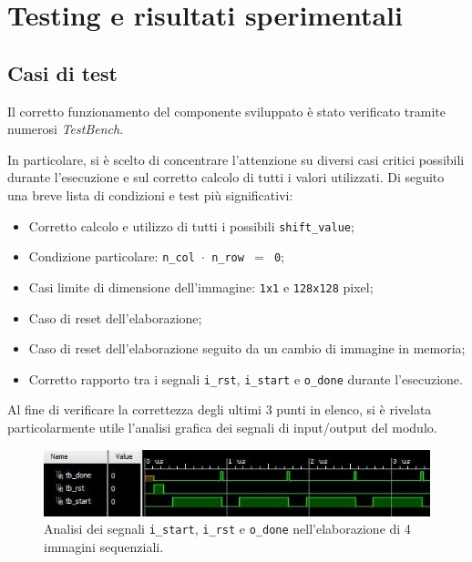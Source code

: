 \documentclass{article}
\begin{document}
\section{Testing e risultati sperimentali} %
\subsection{Casi di test} %
Il corretto funzionamento del componente sviluppato è stato verificato tramite numerosi \emph{TestBench}.\par In particolare, si è scelto di concentrare l’attenzione su diversi casi critici possibili durante l’esecuzione e sul corretto calcolo di tutti i valori utilizzati. Di seguito una breve lista di condizioni e test più significativi:

\begin{itemize}
    \item   Corretto calcolo e utilizzo di tutti i possibili \texttt{shift\_value};
    \item   Condizione particolare: \texttt{n\_col $\cdot$ n\_row $=$ 0}\footnotemark ;
    \item   Casi limite di dimensione dell’immagine: \texttt{1x1} e \texttt{128x128} pixel;
    \item   Caso di reset dell’elaborazione;
    \item   Caso di reset dell’elaborazione seguito da un cambio di immagine in memoria;
    \item   Corretto rapporto tra i segnali \texttt{i\_rst}, \texttt{i\_start} e \texttt{o\_done} durante   l’esecuzione.
\end{itemize}

Al fine di verificare la correttezza degli ultimi 3 punti in elenco, si è rivelata particolarmente utile l'analisi grafica dei segnali di input/output del modulo.
\vspace{0,2cm}

\begin{figure}[ht]
    \centering
    \includegraphics[scale=0.9]{segnaliSignificativi.jpg}
    \caption{Analisi dei segnali \texttt{i\_start}, \texttt{i\_rst} e \texttt{o\_done} nell'elaborazione di 4 immagini sequenziali.}
\end{figure}
\vspace{0,2cm}
\end{document}
